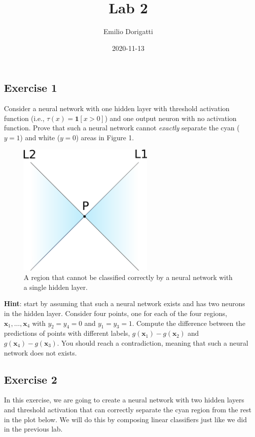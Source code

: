 \documentclass[
]{article}
\title{Lab 2}
\author{Emilio Dorigatti}
\date{2020-11-13}
\begin{document}
\maketitle

\hypertarget{exercise-1}{%
\subsection{Exercise 1}\label{exercise-1}}

Consider a neural network with one hidden layer with threshold
activation function (i.e., \(\tau(x)=\mathbf{1}[x>0]\)) and one output
neuron with no activation function. Prove that such a neural network
cannot \emph{exactly} separate the cyan (\(y=1\)) and white (\(y=0\))
areas in Figure 1.

\begin{figure}
\centering
\includegraphics[width=2.60417in,height=\textheight]{lab2f1.png}
\caption{A region that cannot be classified correctly by a neural
network with a single hidden layer.}
\end{figure}

\textbf{Hint}: start by assuming that such a neural network exists and
has two neurons in the hidden layer. Consider four points, one for each
of the four regions, \(\textbf{x}_1,\ldots,\textbf{x}_4\) with
\(y_2=y_4=0\) and \(y_1=y_3=1\). Compute the difference between the
predictions of points with different labels,
\(g(\textbf{x}_1)-g(\textbf{x}_2)\) and
\(g(\textbf{x}_4)-g(\textbf{x}_3)\). You should reach a contradiction,
meaning that such a neural network does not exists.

\hypertarget{exercise-2}{%
\subsection{Exercise 2}\label{exercise-2}}

In this exercise, we are going to create a neural network with two
hidden layers and threshold activation that can correctly separate the
cyan region from the rest in the plot below. We will do this by
composing linear classifiers just like we did in the previous lab.
\end{document}
